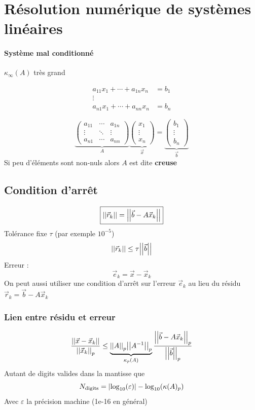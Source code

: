 \documentclass[resume]{subfiles}
\begin{document}
    \section{Résolution numérique de systèmes linéaires}
\paragraph{Système mal conditionné} $\kappa_\infty(A)$ très grand     
    
    \begin{align*}
    a_{11}x_1+\cdots+a_{1n}x_n &=b_1\\
    \vdots \\
    a_{n1}x_1 + \cdots + a_{nn}x_n &= b_n
    \end{align*}
    
    $$\underbrace{\begin{pmatrix}
    a_{11} & \cdots & a_{1n}\\
    \vdots & \ddots & \vdots\\
    a_{n1} & \cdots & a_{nn}
    \end{pmatrix}}_{A}\underbrace{\begin{pmatrix}
    x_1\\\vdots\\x_n
    \end{pmatrix}}_{\vec{x}}=\underbrace{\begin{pmatrix}
    b_1\\\vdots\\b_n
    \end{pmatrix}}_{\vec{b}}$$
	Si peu d'éléments sont non-nuls alors $A$ est dite \textbf{creuse}
	\subsection{Condition d'arrêt}
	$$\boxed{\abs{\abs{\vec{r}_k}}=\abs{\abs{\vec{b}-A\vec{x}_k}}}$$
	Tolérance fixe $\tau$ (par exemple $10^{-5}$)
	$$\abs{\abs{\vec{r}_k}}\leq \tau\abs{\abs{\vec{b}}}$$
	Erreur :
	$$\vec{e}_k=\vec{x}-\vec{x}_k$$
	On peut aussi utiliser une condition d'arrêt sur l'erreur $\vec{e}_k$ au lieu du résidu $\vec{r}_k=\vec{b}-A\vec{x}_k$
	\subsubsection{Lien entre résidu et erreur}
	$$\frac{\abs{\abs{\vec{x}-\vec{x}_k}}}{\abs{\abs{\vec{x}_k}}_p}\leq \underbrace{\abs{\abs{A}}_p\abs{\abs{A^{-1}}}_p}_{\kappa_p(A)}\frac{\abs{\abs{\vec{b}-A\vec{x}_k}}_p}{\abs{\abs{\vec{b}}}_p}$$
	Autant de digits valides dans la mantisse que
	$$N_\text{digits}=\abs{\log_{10}(\varepsilon)}-\log_{10}(\kappa(A)_p)$$
	Avec $\varepsilon$ la précision machine (1e-16 en général)
\end{document}
